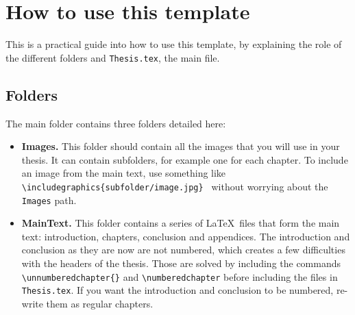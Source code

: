 \chapter{How to use this template} \label{ch-2}

This is a practical guide into how to use this template, by explaining the role of the different folders and \texttt{Thesis.tex}, the main file.

\section{Folders}

The main folder contains three folders detailed here:

\begin{itemize}

\item \textbf{Images.} This folder should contain all the images that you will use in your thesis. It can contain subfolders, for example one for each chapter. To include an image from the main text, use something like \texttt{\textbackslash includegraphics\{subfolder/image.jpg\} } without worrying about the \texttt{Images} path.

\item \textbf{MainText.} This folder contains a series of \LaTeX\ files that form the main text: introduction, chapters, conclusion and appendices. The introduction and conclusion as they are now are not numbered, which creates a few difficulties with the headers of the thesis. Those are solved by including the commands \texttt{\textbackslash unnumberedchapter\{\}} and \texttt{\textbackslash numberedchapter} before including the files in \texttt{Thesis.tex}. If you want the introduction and conclusion to be numbered, re-write them as regular chapters.  


\end{itemize}
